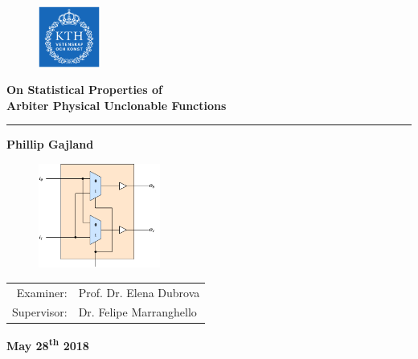 \documentclass[10pt, compress]{beamer}
\title{}
\subtitle{On Statistical Properties of\\Arbiter Physical Unclonable Function}
\date{\today}
\author{Phillip Gajland}
\institute{KTH Royal Institute of Technology}
\begin{document}
\begin{frame}[plain,t]
    
    \begin{figure}
        \begin{flushright}
        \vspace{-2.25cm}
        \includegraphics[width = 20mm]{figures/kth_logo.png}
        \end{flushright}
    \end{figure}
    
    \vspace{2cm}
    
    {\large\textbf{On Statistical Properties of\\[0.25cm]
    Arbiter Physical Unclonable Functions}}
    \\\rule{7.5cm}{1pt}
    
    \vspace{0.25cm}
    
    {\large\textbf{Phillip Gajland}}
    
    \vspace{0.5cm}
    
    \begin{figure}
        \begin{flushright}
        \vspace{-1cm}
        \includegraphics[width = 40mm]{figures/switch_block_detailed.pdf}
        \end{flushright}
    \end{figure}
    
    {\normalsize
    \begin{tabular}{ r l }
    Examiner: & Prof. Dr. Elena Dubrova\\
    Supervisor: & Dr. Felipe Marranghello
    \end{tabular}}
    
    \vspace{1cm}
    
    \textbf{May 28\textsuperscript{th} 2018}

\end{frame}
\end{document}
